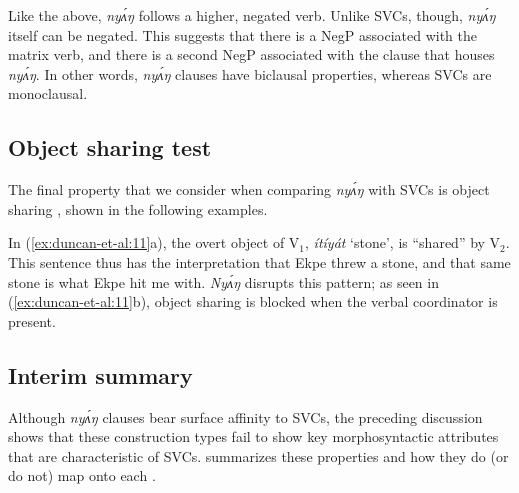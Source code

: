 \documentclass[output=paper,modfonts,nonflat,
]{langsci/langscibook}
\begin{document}
\noindent Like the  above, \textit{ny\'{ʌ}ŋ} follows a higher, negated verb. Unlike SVCs, though, \textit{ny\'{ʌ}ŋ} itself can be negated. This suggests that there is a NegP associated with the matrix verb, and there is a second NegP associated with the clause that houses \textit{ny\'{ʌ}ŋ}. In other words, \textit{ny\'{ʌ}ŋ} clauses have biclausal properties, whereas SVCs are monoclausal.

\subsection{Object sharing test}\label{sec:duncan-et-al:2.4}

The final property that we consider when comparing \textit{ny\'{ʌ}ŋ} with SVCs is object sharing \citep{baker1989object}, shown in the following examples.

\ea\label{ex:duncan-et-al:11}
\z
\z

\noindent In (\ref{ex:duncan-et-al:11}a), the overt object of V$_1$, \textit{ítíyát} `stone', is ``shared'' by V$_2$. This sentence thus has the interpretation that Ekpe threw a stone, and that same stone is what Ekpe hit me with. \textit{Ny\'{ʌ}ŋ} disrupts this pattern; as seen in (\ref{ex:duncan-et-al:11}b), object sharing is blocked when the verbal coordinator is present.

\subsection{Interim summary}\label{sec:duncan-et-al:2.5}

Although \textit{ny\'{ʌ}ŋ} clauses bear surface affinity to SVCs, the preceding discussion shows that these construction types fail to show key morphosyntactic attributes that are characteristic of SVCs.  summarizes these properties and how they do (or do not) map onto each .
\end{document}
